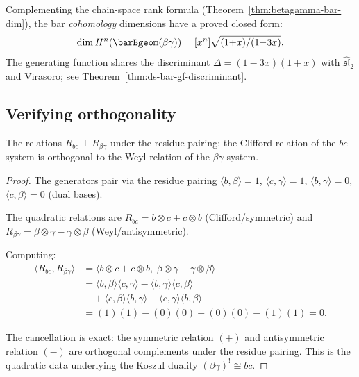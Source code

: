 \begin{remark}\label{rem:betagamma-bar-cohomology-gf}
Complementing the chain-space rank formula (Theorem~\ref{thm:betagamma-bar-dim}),
the bar \emph{cohomology} dimensions have a proved closed form:
\[
\dim H^n(\barBgeom(\beta\gamma))
= [x^n]\sqrt{(1{+}x)/(1{-}3x)},
\]
The generating function shares the discriminant
$\Delta = (1{-}3x)(1{+}x)$
with $\widehat{\mathfrak{sl}}_2$ and Virasoro;
see Theorem~\ref{thm:ds-bar-gf-discriminant}.
\end{remark}
 
\subsection{Verifying orthogonality}
 
\begin{proposition}\label{prop:bc-betagamma-orthogonality}
The relations $R_{bc} \perp R_{\beta\gamma}$ under the residue pairing: the Clifford relation of the $bc$ system is orthogonal to the Weyl relation of the $\beta\gamma$ system.
\end{proposition}

\begin{proof}
The generators pair via the residue pairing $\langle b, \beta \rangle = 1$, $\langle c, \gamma \rangle = 1$, $\langle b, \gamma \rangle = 0$, $\langle c, \beta \rangle = 0$ (dual bases).

The quadratic relations are $R_{bc} = b \otimes c + c \otimes b$ (Clifford/symmetric) and $R_{\beta\gamma} = \beta \otimes \gamma - \gamma \otimes \beta$ (Weyl/antisymmetric).

Computing:
\begin{align*}
\langle R_{bc}, R_{\beta\gamma} \rangle &= \langle b \otimes c + c \otimes b, \; \beta \otimes \gamma - \gamma \otimes \beta \rangle \\
&= \langle b, \beta \rangle \langle c, \gamma \rangle - \langle b, \gamma \rangle \langle c, \beta \rangle \\
&\quad + \langle c, \beta \rangle \langle b, \gamma \rangle - \langle c, \gamma \rangle \langle b, \beta \rangle \\
&= (1)(1) - (0)(0) + (0)(0) - (1)(1) = 0.
\end{align*}

The cancellation is exact: the symmetric relation $(+)$ and antisymmetric relation $(-)$ are orthogonal complements under the residue pairing.  This is the quadratic data underlying the Koszul duality $(\beta\gamma)^! \cong bc$.
\end{proof}
 
